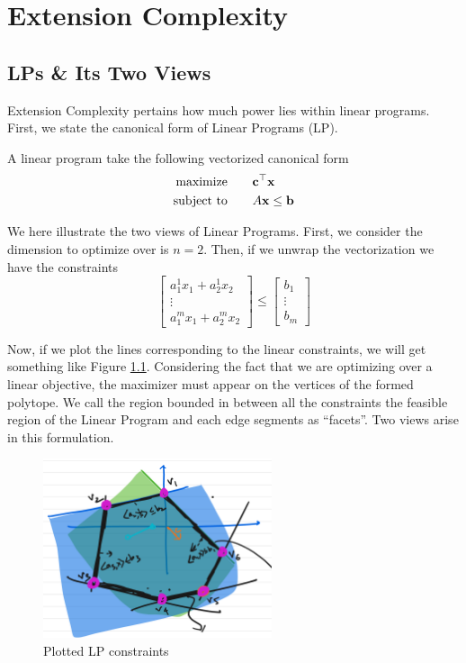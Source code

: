 \chapter{Extension Complexity}

\section{LPs \& Its Two Views}
Extension Complexity pertains how much power lies within linear programs. First, we state the canonical form of Linear Programs (LP). 
\begin{definition}
	A linear program take the following vectorized canonical form
	\begin{align}
		\text{maximize} &\quad \quad  \mathbf{c}^\top \mathbf{x} \\
		\text{subject to} & \quad \quad A\mathbf{x} \leq \mathbf{b} 
	\end{align}
\end{definition}

We here illustrate the two views of Linear Programs. First, we consider the dimension to optimize over is $n = 2$. Then, if we unwrap the vectorization we have the constraints
\begin{equation}
	\begin{bmatrix}
		a_1^1x_1 + a_2^1 x_2 \\
		\vdots \\
		a_1^m x_1 + a_2^m x_2
	\end{bmatrix} 
	\leq 
	\begin{bmatrix}
		b_1 \\
		\vdots \\
		b_m
	\end{bmatrix}
\end{equation}

Now, if we plot the lines corresponding to the linear constraints, we will get something like Figure \ref{fig:lp-view}. Considering the fact that we are optimizing over a linear objective, the maximizer must appear on the vertices of the formed polytope. We call the region bounded in between all the constraints the feasible region of the Linear Program and each edge segments as ``facets''. Two views arise in this formulation. 

\begin{figure}
	\center
	\includegraphics[width=0.6\textwidth]{figs/lp-view.png}
	\caption{Plotted LP constraints}
	\label{fig:lp-view}
\end{figure}

